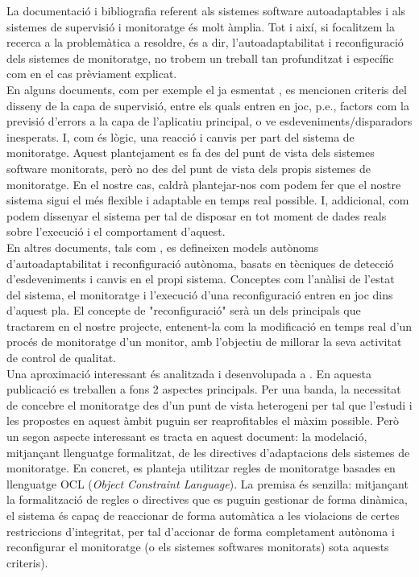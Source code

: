 La documentació i bibliografia referent als sistemes software autoadaptables i als sistemes de supervisió i monitoratge és molt àmplia. Tot i així, si focalitzem la recerca a la problemàtica a resoldre, és a dir, l’autoadaptabilitat i reconfiguració dels sistemes de monitoratge, no trobem un treball tan profunditzat i específic com en el cas prèviament explicat.\\

En alguns documents, com per exemple el ja esmentat \cite{napols}, es mencionen criteris del disseny de la capa de supervisió, entre els quals entren en joc, p.e., factors com la previsió d’errors a la capa de l’aplicatiu principal, o ve esdeveniments/disparadors inesperats. I, com és lògic, una reacció i canvis per part del sistema de monitoratge. Aquest plantejament es fa des del punt de vista dels sistemes software monitorats, però no des del punt de vista dels propis sistemes de monitoratge. En el nostre cas, caldrà plantejar-nos com podem fer que el nostre sistema sigui el més flexible i adaptable en temps real possible. I, addicional, com podem dissenyar el sistema per tal de disposar en tot moment de dades reals sobre l'execució i el comportament d'aquest.\\

En altres documents, tals com \cite{ibm}, es defineixen models autònoms d’autoadaptabilitat i reconfiguració autònoma, basats en tècniques de detecció d’esdeveniments i canvis en el propi sistema. Conceptes com l’anàlisi de l’estat del sistema, el monitoratge i l’execució d’una reconfiguració entren en joc dins d’aquest pla. El concepte de "reconfiguració" serà un dels principals que tractarem en el nostre projecte, entenent-la com la modificació en temps real d'un procés de monitoratge d'un monitor, amb l'objectiu de millorar la seva activitat de control de qualitat.\\

Una aproximació interessant és analitzada i desenvolupada a \cite{heterogeneous}. En aquesta publicació es treballen a fons 2 aspectes principals. Per una banda, la necessitat de concebre el monitoratge des d'un punt de vista heterogeni per tal que l'estudi i les propostes en aquest àmbit puguin ser reaprofitables el màxim possible. Però un segon aspecte interessant es tracta en aquest document: la modelació, mitjançant llenguatge formalitzat, de les directives d'adaptacions dels sistemes de monitoratge. En concret, es planteja utilitzar regles de monitoratge basades en llenguatge OCL (\textit{Object Constraint Language}). La premisa és senzilla: mitjançant la formalització de regles o directives que es puguin gestionar de forma dinàmica, el sistema és capaç de reaccionar de forma automàtica a les violacions de certes restriccions d'integritat, per tal d'accionar de forma completament autònoma i reconfigurar el monitoratge (o els sistemes softwares monitorats) sota aquests criteris).\\

